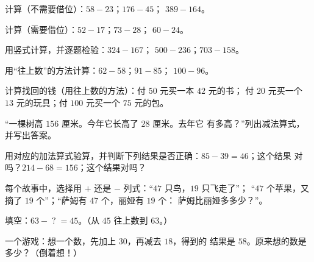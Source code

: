 \begin{exercise}[$\star$]\label{exo:g2:subtraction:1}
计算（不需要借位）：$58 - 23$；\quad $176 - 45$；\quad
$389 - 164$。
\end{exercise}

\begin{exercise}[$\star$]\label{exo:g2:subtraction:2}
计算（需要借位）：$52 - 17$；\quad $73 - 28$；\quad
$60 - 24$。
\end{exercise}

\begin{exercise}[$\star$]\label{exo:g2:subtraction:3}
用竖式计算，并逐题检验：$324 - 167$；\quad
$500 - 236$；\quad $703 - 158$。
\end{exercise}

\begin{exercise}[$\star$]\label{exo:g2:subtraction:4}
用“往上数”的方法计算：$62 - 58$；\quad $91 - 85$；\quad
$100 - 96$。
\end{exercise}

\begin{exercise}[$\star$]\label{exo:g2:subtraction:5}
计算找回的钱（用往上数的方法）：付 $50$ 元买一本 $42$ 元的书；
付 $20$ 元买一个 $13$ 元的玩具；付 $100$ 元买一个 $75$ 元的包。
\end{exercise}

\begin{exercise}[$\star$]\label{exo:g2:subtraction:6}
“一棵树高 $156$ 厘米。今年它长高了 $28$ 厘米。去年它
有多高？”列出减法算式，并写出答案。
\end{exercise}

\begin{exercise}[$\star$]\label{exo:g2:subtraction:7}
用对应的加法算式验算，并判断下列结果是否正确：$85 - 39 = 46$；这个结果
对吗？$214 - 68 = 156$；这个结果对吗？
\end{exercise}

\begin{exercise}[$\star$]\label{exo:g2:subtraction:8}
每个故事中，选择用 $+$ 还是 $-$ 列式：“$47$ 只鸟，$19$ 只飞走了”；
“$47$ 个苹果，又摘了 $19$ 个”；“萨姆有 $47$ 个，丽娅有 $19$ 个：
萨姆比丽娅多多少？”。
\end{exercise}

\begin{exercise}[$\star$]\label{exo:g2:subtraction:9}
填空：$63 - \;?\; = 45$。（从 $45$ 往上数到 $63$。）
\end{exercise}

\begin{exercise}[$\star\star$]\label{exo:g2:subtraction:10}
一个游戏：想一个数，先加上 $30$，再减去 $18$，得到的
结果是 $58$。原来想的数是多少？（倒着想！）
\end{exercise}
